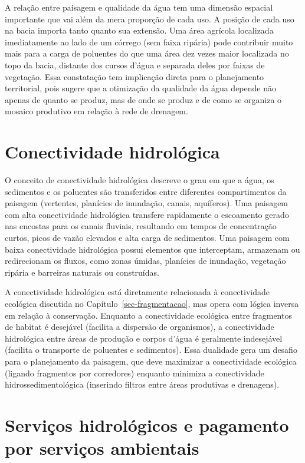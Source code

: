 \documentclass[
  portuguese,
  11pt,
  a4paper,
  open=any]{scrbook}
\begin{document}
A relação entre paisagem e qualidade da água tem uma dimensão espacial
importante que vai além da mera proporção de cada uso. A posição de cada
uso na bacia importa tanto quanto sua extensão. Uma área agrícola
localizada imediatamente ao lado de um córrego (sem faixa ripária) pode
contribuir muito mais para a carga de poluentes do que uma área dez
vezes maior localizada no topo da bacia, distante dos cursos d'água e
separada deles por faixas de vegetação. Essa constatação tem implicação
direta para o planejamento territorial, pois sugere que a otimização da
qualidade da água depende não apenas de quanto se produz, mas de onde se
produz e de como se organiza o mosaico produtivo em relação à rede de
drenagem.

\section{Conectividade hidrológica}\label{conectividade-hidroluxf3gica}

O conceito de conectividade hidrológica descreve o grau em que a água,
os sedimentos e os poluentes são transferidos entre diferentes
compartimentos da paisagem (vertentes, planícies de inundação, canais,
aquíferos). Uma paisagem com alta conectividade hidrológica transfere
rapidamente o escoamento gerado nas encostas para os canais fluviais,
resultando em tempos de concentração curtos, picos de vazão elevados e
alta carga de sedimentos. Uma paisagem com baixa conectividade
hidrológica possui elementos que interceptam, armazenam ou redirecionam
os fluxos, como zonas úmidas, planícies de inundação, vegetação ripária
e barreiras naturais ou construídas.

A conectividade hidrológica está diretamente relacionada à conectividade
ecológica discutida no Capítulo~\ref{sec-fragmentacao}, mas opera com
lógica inversa em relação à conservação. Enquanto a conectividade
ecológica entre fragmentos de habitat é desejável (facilita a dispersão
de organismos), a conectividade hidrológica entre áreas de produção e
corpos d'água é geralmente indesejável (facilita o transporte de
poluentes e sedimentos). Essa dualidade gera um desafio para o
planejamento da paisagem, que deve maximizar a conectividade ecológica
(ligando fragmentos por corredores) enquanto minimiza a conectividade
hidrossedimentológica (inserindo filtros entre áreas produtivas e
drenagens).

\section{Serviços hidrológicos e pagamento por serviços
ambientais}\label{serviuxe7os-hidroluxf3gicos-e-pagamento-por-serviuxe7os-ambientais}
\end{document}
